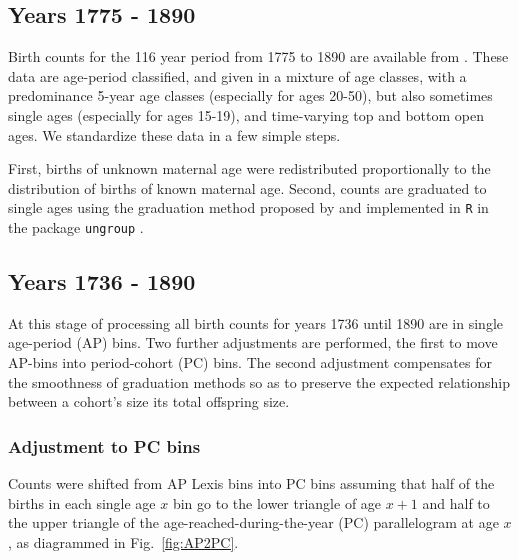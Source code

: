 \documentclass{article}
\begin{document}
\begin{appendix}
\subsection{Years 1775 - 1890}
Birth counts for the 116 year period from 1775 to 1890 are available from \citet{sgf1907}. These data are age-period classified, and given in a mixture of age classes, with a
predominance 5-year age classes (especially for ages 20-50), but also sometimes
single ages (especially for ages 15-19), and time-varying top and bottom open
ages. We standardize these data in a few simple steps.

First, births of unknown maternal age were redistributed proportionally to the distribution of births of known maternal age. Second, counts are graduated to single ages using the graduation method proposed by \citet{rizzi2015efficient} and implemented in \texttt{R} in the package \texttt{ungroup} \citep{ungroup}. 

\subsection{Years 1736 - 1890}
At this stage of processing all birth counts for years 1736 until 1890 are in single age-period (AP) bins. Two further adjustments are performed, the first to move AP-bins into period-cohort (PC) bins. The second adjustment compensates for the smoothness of graduation methods so as to preserve the expected relationship between a cohort's size its total offspring size.

\subsubsection{Adjustment to PC bins}
Counts were shifted from AP Lexis bins into PC bins assuming that half of the births in each single age $x$ bin go to the lower triangle of age $x+1$ and half to the upper triangle of the age-reached-during-the-year (PC) parallelogram at age $x$, as diagrammed in Fig.~\ref{fig:AP2PC}.


\end{appendix}
\end{document}
